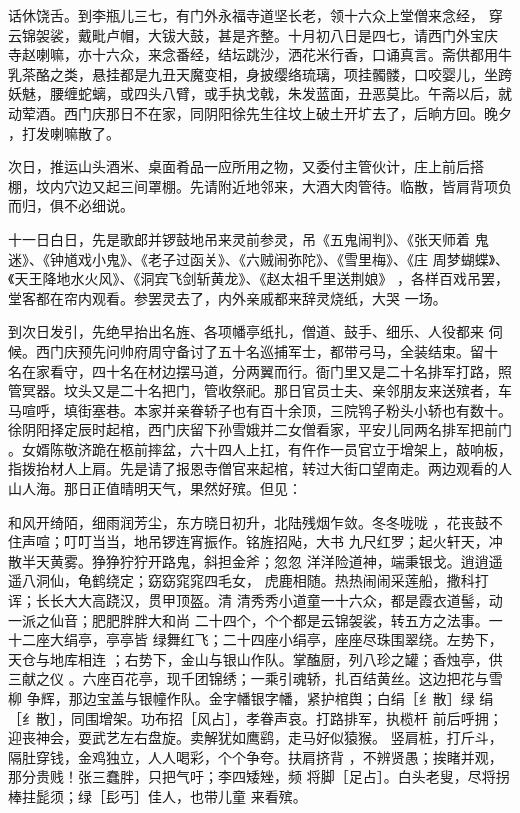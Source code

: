 话休饶舌。到李瓶儿三七，有门外永福寺道坚长老，领十六众上堂僧来念经，
穿云锦袈裟，戴毗卢帽，大钹大鼓，甚是齐整。十月初八日是四七，请西门外宝庆
寺赵喇嘛，亦十六众，来念番经，结坛跳沙，洒花米行香，口诵真言。斋供都用牛
乳茶酪之类，悬挂都是九丑天魔变相，身披缨络琉璃，项挂髑髅，口咬婴儿，坐跨
妖魅，腰缠蛇螭，或四头八臂，或手执戈戟，朱发蓝面，丑恶莫比。午斋以后，就
动荤酒。西门庆那日不在家，同阴阳徐先生往坟上破土开圹去了，后晌方回。晚夕
，打发喇嘛散了。

次日，推运山头酒米、桌面肴品一应所用之物，又委付主管伙计，庄上前后搭
棚，坟内穴边又起三间罩棚。先请附近地邻来，大酒大肉管待。临散，皆肩背项负
而归，俱不必细说。

十一日白日，先是歌郎并锣鼓地吊来灵前参灵，吊《五鬼闹判》、《张天师着
鬼迷》、《钟馗戏小鬼》、《老子过函关》、《六贼闹弥陀》、《雪里梅》、《庄
周梦蝴蝶》、《天王降地水火风》、《洞宾飞剑斩黄龙》、《赵太祖千里送荆娘》
，各样百戏吊罢，堂客都在帘内观看。参罢灵去了，内外亲戚都来辞灵烧纸，大哭
一场。

到次日发引，先绝早抬出名旌、各项幡亭纸扎，僧道、鼓手、细乐、人役都来
伺候。西门庆预先问帅府周守备讨了五十名巡捕军士，都带弓马，全装结束。留十
名在家看守，四十名在材边摆马道，分两翼而行。衙门里又是二十名排军打路，照
管冥器。坟头又是二十名把门，管收祭祀。那日官员士夫、亲邻朋友来送殡者，车
马喧呼，填街塞巷。本家并亲眷轿子也有百十余顶，三院鸨子粉头小轿也有数十。
徐阴阳择定辰时起棺，西门庆留下孙雪娥并二女僧看家，平安儿同两名排军把前门
。女婿陈敬济跪在柩前摔盆，六十四人上扛，有仵作一员官立于增架上，敲响板，
指拨抬材人上肩。先是请了报恩寺僧官来起棺，转过大街口望南走。两边观看的人
山人海。那日正值晴明天气，果然好殡。但见：

和风开绮陌，细雨润芳尘，东方晓日初升，北陆残烟乍敛。冬冬咙咙
，花丧鼓不住声喧；叮叮当当，地吊锣连宵振作。铭旌招飐，大书
九尺红罗；起火轩天，冲散半天黄雾。狰狰狞狞开路鬼，斜担金斧；忽忽
洋洋险道神，端秉银戈。逍逍遥遥八洞仙，龟鹤绕定；窈窈窕窕四毛女，
虎鹿相随。热热闹闹采莲船，撒科打诨；长长大大高跷汉，贯甲顶盔。清
清秀秀小道童一十六众，都是霞衣道髻，动一派之仙音；肥肥胖胖大和尚
二十四个，个个都是云锦袈裟，转五方之法事。一十二座大绢亭，亭亭皆
绿舞红飞；二十四座小绢亭，座座尽珠围翠绕。左势下，天仓与地库相连
；右势下，金山与银山作队。掌醢厨，列八珍之罐；香烛亭，供三献之仪
。六座百花亭，现千团锦绣；一乘引魂轿，扎百结黄丝。这边把花与雪柳
争辉，那边宝盖与银幢作队。金字幡银字幡，紧护棺舆；白绢［纟散］绿
绢［纟散］，同围增架。功布招［风占］，孝眷声哀。打路排军，执榄杆
前后呼拥；迎丧神会，耍武艺左右盘旋。卖解犹如鹰鹞，走马好似猿猴。
竖肩桩，打斤斗，隔肚穿钱，金鸡独立，人人喝彩，个个争夸。扶肩挤背
，不辨贤愚；挨睹并观，那分贵贱！张三蠢胖，只把气吁；李四矮矬，频
将脚［足占］。白头老叟，尽将拐棒拄髭须；绿［髟丐］佳人，也带儿童
来看殡。

